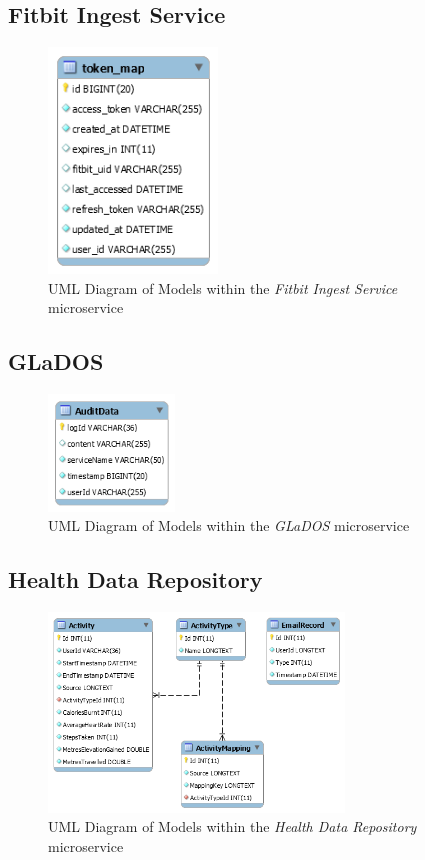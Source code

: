 \subsection{Fitbit Ingest Service}
\begin{figure}[H]
    \centering
    \includegraphics[width=0.4\textwidth]{Images/db_uml/fitbit-ingest-service.png}
    \caption{UML Diagram of Models within the \textit{Fitbit Ingest Service} microservice}
    \label{fig:db_uml:fitbit-ingest-service}
\end{figure}

\subsection{GLaDOS}
\begin{figure}[H]
    \centering
    \includegraphics[width=0.3\textwidth]{Images/db_uml/glados.png}
    \caption{UML Diagram of Models within the \textit{GLaDOS} microservice}
    \label{fig:db_uml:glados}
\end{figure}

\subsection{Health Data Repository}
\begin{figure}[H]
    \centering
    \includegraphics[width=0.7\textwidth]{Images/db_uml/health-data-repository.png}
    \caption{UML Diagram of Models within the \textit{Health Data Repository} microservice}
    \label{fig:db_uml:health-data-repository}
\end{figure}

